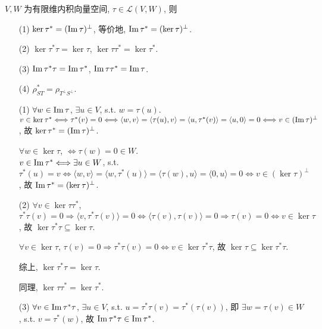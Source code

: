 \documentclass{note}
\begin{document}
\begin{thm}[(课本定理 10.3)]
    $V,W$ 为有限维内积向量空间, $\tau\in\mathcal{L}(V,W)$, 则
    \begin{itemize}
        \item[(1)] $\ker\tau^*=(\operatorname{Im}\tau)^{\perp}$, 等价地, $\operatorname{Im}\tau^*=(\ker\tau)^{\perp}$.
        \item[(2)] $\ker\tau^*\tau=\ker\tau$, $\ker\tau\tau^*=\ker\tau^*$.
        \item[(3)] $\operatorname{Im}\tau^*\tau=\operatorname{Im}\tau^*$, $\operatorname{Im}\tau\tau^*=\operatorname{Im}\tau$.
        \item[(4)] $\rho_{ST}^*=\rho_{T^{\perp}S^{\perp}}$.
    \end{itemize}
\end{thm}
\begin{pf}
    \begin{itemize}
        \item[(1)] $\forall w\in\operatorname{Im}\tau$, $\exists u\in V$, s.t. $w=\tau(u)$.\\
        $v\in\ker\tau^*\Longleftrightarrow\tau^*(v)=0\Longleftrightarrow\langle w,v\rangle=\langle\tau(u),v\rangle=\langle u,\tau^*(v)\rangle=\langle u,0\rangle=0\Longleftrightarrow v\in(\operatorname{Im}\tau)^{\perp}$, 故 $\ker\tau^*=(\operatorname{Im}\tau)^{\perp}$.

        $\forall w\in\ker\tau$, $\Longleftrightarrow$$\tau(w)=0\in W$.\\
        $v\in\operatorname{Im}\tau^*\Longleftrightarrow\exists u\in W$, s.t. $\tau^*(u)=v\Longleftrightarrow\langle w,v\rangle=\langle w,\tau^*(u)\rangle=\langle\tau(w),u\rangle=\langle 0,u\rangle=0\Longleftrightarrow v\in(\ker\tau)^{\perp}$, 故 $\operatorname{Im}\tau^*=(\ker\tau)^{\perp}$.
        \item[(2)] $\forall v\in\ker\tau\tau^*$, $\tau^*\tau(v)=0\Longrightarrow\langle v,\tau^*\tau(v)\rangle=0\Longleftrightarrow\langle\tau(v),\tau(v)\rangle=0\Longrightarrow\tau(v)=0\Longleftrightarrow v\in\ker\tau$, 故 $\ker\tau^*\tau\subseteq\ker\tau$.

        $\forall v\in\ker\tau$, $\tau(v)=0\Longrightarrow\tau^*\tau(v)=0\Longleftrightarrow v\in\ker\tau^*\tau$, 故 $\ker\tau\subseteq\ker\tau^*\tau$.

        综上, $\ker\tau^*\tau=\ker\tau$.

        同理, $\ker\tau\tau^*=\ker\tau^*$.
        \item[(3)] $\forall v\in\operatorname{Im}\tau^*\tau$, $\exists u\in V$, s.t. $u=\tau^*\tau(v)=\tau^*(\tau(v))$, 即 $\exists w=\tau(v)\in W$, s.t. $v=\tau^*(w)$, 故 $\operatorname{Im}\tau^*\tau\in\operatorname{Im}\tau^*$.


\end{itemize}
\end{pf}
\end{document}
